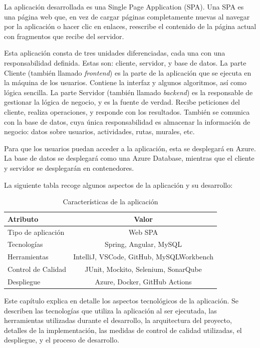 La aplicación desarrollada es una Single Page Application (SPA). Una SPA es una página web que, en vez de cargar páginas completamente nuevas al navegar por la aplicación o hacer clic en enlaces, reescribe el contenido de la página actual con fragmentos que recibe del servidor. 

Esta aplicación consta de tres unidades diferenciadas, cada una con una responsabilidad definida. Estas son: cliente, servidor, y base de datos. La parte Cliente (también llamado \textit{frontend}) es la parte de la aplicación que se ejecuta en la máquina de los usuarios. Contiene la interfaz y algunos algoritmos, así como lógica sencilla. La parte Servidor (también llamado \textit{backend}) es la responsable de gestionar la lógica de negocio, y es la fuente de verdad. Recibe peticiones del cliente, realiza operaciones, y responde con los resultados. También se comunica con la base de datos, cuya única responsabilidad es almacenar la información de negocio: datos sobre usuarios, actividades, rutas, murales, etc.

Para que los usuarios puedan acceder a la aplicación, esta se desplegará en Azure. La base de datos se desplegará como una Azure Database, mientras que el cliente y servidor se desplegarán en contenedores.

\noindent La siguiente tabla recoge algunos aspectos de la aplicación y su desarrollo: 
\begin{table}[h]
\centering
\begin{tabular}{l c}
\textbf{Atributo} & \textbf{Valor} \\
\hline
Tipo  de aplicación& Web SPA \\
Tecnologías & Spring, Angular, MySQL \\
Herramientas & IntelliJ, VSCode, GitHub, MySQLWorkbench \\
Control de Calidad & JUnit, Mockito, Selenium, SonarQube \\
Despliegue & Azure, Docker, GitHub Actions \\
\end{tabular}
\caption{Características de la aplicación}
\label{tab:caracteristicas_app}
\end{table}

Este capítulo explica en detalle los aspectos tecnológicos de la aplicación. Se describen las tecnologías que utiliza la aplicación al ser ejecutada, las herramientas utilizadas durante el desarrollo, la arquitectura del proyecto, detalles de la implementación, las medidas de control de calidad utilizadas, el despliegue, y el proceso de desarrollo.

